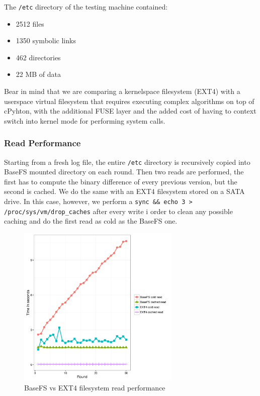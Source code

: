 \documentclass{sig-alternate}
\begin{document}
The \texttt{/etc} directory of the testing machine contained:

\begin{itemize}
 \item 2512 files
 \item 1350 symbolic links
 \item 462 directories
 \item 22 MB of data
\end{itemize}

Bear in mind that we are comparing a kernelspace filesystem (EXT4) with a userspace virtual filesystem that requires executing complex algorithms on top of cPyhton, with the additional FUSE layer and the added cost of having to context switch into kernel mode for performing system calls.

\subsubsection{Read Performance}

Starting from a fresh log file, the entire \texttt{/etc} directory is recursively copied into BaseFS mounted directory on each round. Then two reads are performed, the first has to compute the binary difference of every previous version, but the second is cached. We do the same with an EXT4 filesystem stored on a SATA drive. In this case, however, we perform a \texttt{sync \&\& echo 3 > /proc/sys/vm/drop\_caches} after every write i order to clean any possible caching and do the first read as cold as the BaseFS one.

\begin{figure}
\centering
\includegraphics[width=220pt]{imgs/read_performance.png}
\caption{BaseFS vs EXT4 filesystem read performance}
\label{fig:read-performance}
\end{figure}
\end{document}

